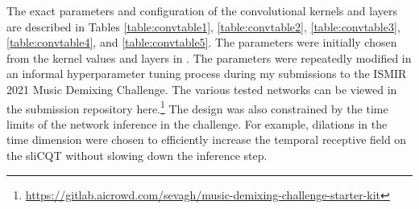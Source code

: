\documentclass[report.tex]{subfiles}
\begin{document}
The exact parameters and configuration of the convolutional kernels and layers are described in Tables \ref{table:convtable1}, \ref{table:convtable2}, \ref{table:convtable3}, \ref{table:convtable4}, and \ref{table:convtable5}. The parameters were initially chosen from the kernel values and layers in \textcite{plumbley1, plumbley2}. The parameters were repeatedly modified in an informal hyperparameter tuning process during my submissions to the ISMIR 2021 Music Demixing Challenge. The various tested networks can be viewed in the submission repository here.\footnote{\url{https://gitlab.aicrowd.com/sevagh/music-demixing-challenge-starter-kit}} The design was also constrained by the time limits of the network inference in the challenge. For example, dilations in the time dimension were chosen to efficiently increase the temporal receptive field on the sliCQT without slowing down the inference step.
\end{document}
